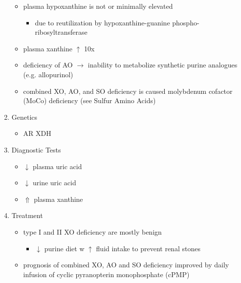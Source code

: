 \documentclass[12pt]{scrartcl}
\begin{document}
\begin{enumerate}
\begin{itemize}
\item plasma hypoxanthine is not or minimally elevated
\begin{itemize}
\item due to reutilization by hypoxanthine-guanine phospho-ribosyltransferase
\end{itemize}
\item plasma xanthine \(\uparrow\) 10x
\item deficiency of AO \(\to\) inability to metabolize synthetic purine
analogues (e.g. allopurinol)
\item combined XO, AO, and SO deficiency is caused molybdenum cofactor
(MoCo) deficiency (see Sulfur Amino Acids)
\end{itemize}

\item Genetics
\label{sec:orgb95e01f}
\begin{itemize}
\item AR XDH
\end{itemize}

\item Diagnostic Tests
\label{sec:org3415a0e}
\begin{itemize}
\item \(\downarrow\) plasma uric acid
\item \(\downarrow\) urine uric acid
\item \(\Uparrow\) plasma xanthine
\end{itemize}

\item Treatment
\label{sec:orged0f23f}
\begin{itemize}
\item type I and II XO deficiency are mostly benign
\begin{itemize}
\item \(\downarrow\) purine diet w \(\uparrow\) fluid intake to prevent renal stones
\end{itemize}
\item prognosis of combined XO, AO and SO deficiency improved by daily
infusion of cyclic pyranopterin monophosphate (cPMP)
\end{itemize}
\end{enumerate}
\end{document}
